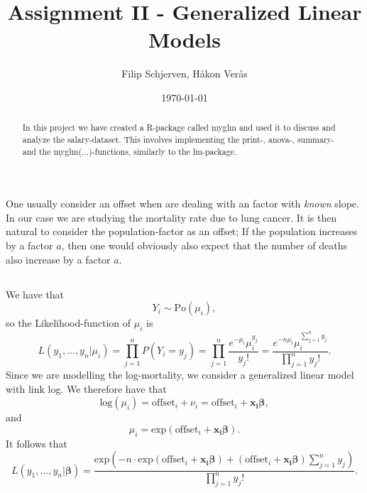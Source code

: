 \documentclass{article}
\title{Assignment II - Generalized Linear Models}
\author{Filip Schjerven, Håkon Verås}
\date{\today}
\begin{document}
\maketitle
\begin{abstract}
In this project we have created a R-package called myglm and used it to discuss and analyze the salary-dataset. This involves implementing the print-, anova-, summary- and the myglm(...)-functions, similarly to the lm-package.
\end{abstract}
\newpage

\section{}

\subsection{}
One usually consider an offset when are dealing with an factor with \textit{known} slope. In our case we are studying the mortality rate due to lung cancer. It is then natural to consider the population-factor as an offset; If the population increases by a factor $a$, then one would obviously also expect that the number of deaths also increase by a factor $a$.

\subsection{}
We have that
\begin{equation*}
Y_{i} \sim \text{Po}(\mu_{i}),
\end{equation*}
so the Likelihood-function of $\mu_{i}$ is
\begin{equation*}
	L(y_{1},...,y_{n}|\mu_{i}) = \prod_{j=1}^{n} P(Y_{i} = y_{j}) = \prod_{j=1}^{n} \frac{e^{-\mu_{i}}\mu_{i}^{y_{j}}}{y_{j}!} = \frac{e^{-n\mu_{i}} \mu_{i}^{\sum_{j=1}^{n} y_{j}} }{\prod_{j=1}^{n} y_{j}!}.
\end{equation*}
Since we are modelling the log-mortality, we consider a generalized linear model with link log. We therefore have that
\begin{equation*}
\text{log}(\mu_{i}) = \text{offset}_{i} + \nu_{i} = \text{offset}_{i} + \boldsymbol{x_{i} \beta},
\end{equation*}
and
\begin{equation*}
\mu_{i} = \text{exp}(\text{offset}_{i} + \boldsymbol{x_{i} \beta}).
\end{equation*}
It follows that
\begin{equation*}
L(y_{1},...,y_{n}|\boldsymbol{\beta}) = \frac{\text{exp}\left(-n \cdot \text{exp}(\text{offset}_{i} + \boldsymbol{x_{i}\beta}) + \left(\text{offset}_{i} + \boldsymbol{x_{i}\beta}\right) \sum_{j=1}^{n}y_{j} \right)}{\prod_{j=1}^{n} y_{j}!}.
\end{equation*}
\end{document}
